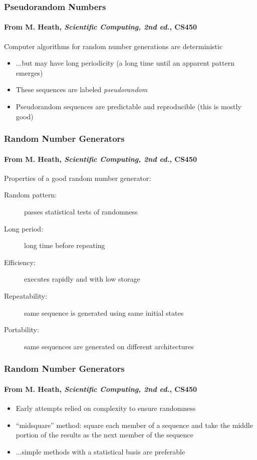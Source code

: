 \documentclass[10pt]{beamer}
\begin{document}
\begin{frame}
\frametitle{Pseudorandom Numbers}
\framesubtitle{From M. Heath, \emph{Scientific Computing, 2nd ed.}, CS450}
\begin{alertblock}{}
    Computer algorithms for random number generations are deterministic
\end{alertblock}
\begin{itemize}
    \item ...but may have long periodicity (a long time until an apparent
pattern emerges)
    \item These sequences are labeled \emph{pseudorandom}
    \item Pseudorandom sequences are predictable and reproducible (this is
mostly good)
\end{itemize}
\end{frame}
\begin{frame}
\frametitle{Random Number Generators}
\framesubtitle{From M. Heath, \emph{Scientific Computing, 2nd ed.}, CS450}
Properties of a good random number generator:
\begin{description}
    \item[Random pattern:]  passes statistical tests of randomness
    \item[Long period:] long time before repeating
    \item[Efficiency:] executes rapidly and with low storage
    \item[Repeatability:] same sequence is generated using same initial states
    \item[Portability:] same sequences are generated on different architectures
\end{description}
\end{frame}
\begin{frame}
\frametitle{Random Number Generators}
\framesubtitle{From M. Heath, \emph{Scientific Computing, 2nd ed.}, CS450}
\begin{itemize}
    \item Early attempts relied on complexity to ensure randomness
    \item ``midsquare'' method: square each member of a sequence and take the
middle portion of the results as the next member of the sequence
    \item ...simple methods with a statistical basis are preferable
\end{itemize}
\end{frame}
\end{document}
